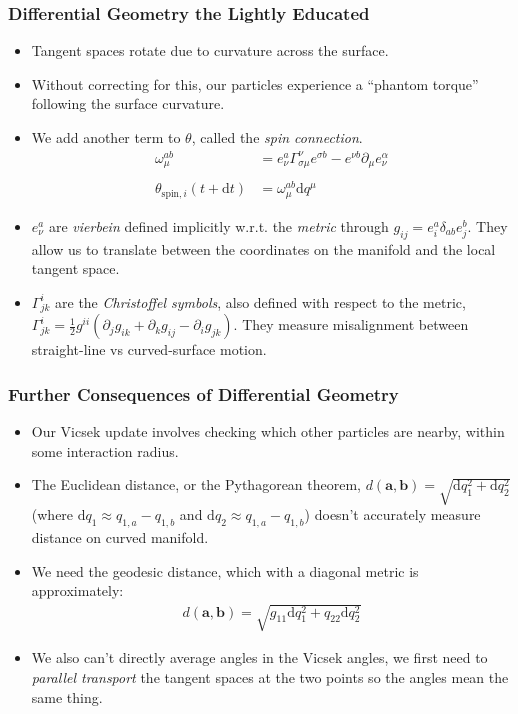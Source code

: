 \documentclass{beamer}
\newcommand{\dt}{\text{d}t}
\begin{document}
\begin{frame}
    \frametitle{Differential Geometry the Lightly Educated}
    
    \begin{itemize}
        \item Tangent spaces rotate due to curvature across the surface.
        \item Without correcting for this, our particles
        experience a ``phantom torque'' following the surface curvature.
        \item We add another term to $\theta$, called the \emph{spin connection}.
        \begin{align*}
            \omega_\mu^{ab} &= e_\nu^a \Gamma^\nu_{\sigma\mu} e^{\sigma b} 
            -
            e^{\nu b} \partial_\mu e_{\nu}^{\alpha}
            \\ & \\
            \theta_{\text{spin},i}(t + \dt) &=
            \omega^{ab}_\mu \text{d}q^\mu
        \end{align*}
        \item $e^a_\nu$ are \emph{vierbein} defined implicitly w.r.t. the \emph{metric} through $g_{ij} = e^{a}_i \delta_{ab}e^b_j$.
        They allow us to translate between the coordinates on the manifold and the local tangent space.
        \item $\Gamma^{i}_{jk}$ are the \emph{Christoffel symbols}, also defined with respect to the metric,
        $\Gamma^{i}_{jk} = \frac{1}{2}g^{ii}\left(\partial_jg_{ik} + \partial_{k}g_{ij} - \partial_ig_{jk}\right)$. They measure
        misalignment between straight-line vs curved-surface motion.
    \end{itemize}
\end{frame}


\begin{frame}
    \frametitle{Further Consequences of Differential Geometry}

    \begin{itemize}
        \item Our Vicsek update involves checking which other particles are nearby,
        within some interaction radius.
        \item The Euclidean distance, or the Pythagorean theorem, $d(\mathbf{a}, \mathbf{b}) = \sqrt{\text{d}q_1^2
        + \text{d}q_2^2}$ (where $\text{d}q_1 \approx q_{1,a} - q_{1,b}$ and $\text{d}q_2 \approx 
        q_{1,a} - q_{1,b}$) doesn't accurately measure distance on curved manifold.
        \item We need the geodesic distance, which with a diagonal metric is approximately:
        \begin{align*}
            d(\mathbf{a}, \mathbf{b}) = \sqrt{g_{11} \text{d}q_1^2+ q_{22}\text{d}q_2^2}
        \end{align*}
        \item We also can't directly average angles in the Vicsek angles, we first need
        to \emph{parallel transport} the tangent spaces at the two points so the angles
        mean the same thing.
    \end{itemize}
\end{frame}
\end{document}

